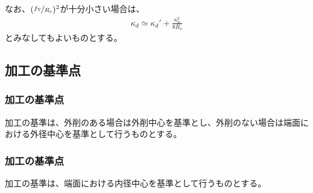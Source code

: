なお、$(\nicefrac{f_\mathrm T}{R_\mathrm c})^2$が十分小さい場合は、
\begin{align*}
  \kappa_d \simeq \kappa_d'+\frac{\kappa_w^2}{8R_\mathrm o}
\end{align*}
とみなしてもよいものとする。



\clearpage


\subsection{\EndFaceChamfer 加工の基準点}

\subsubsection{\EndFaceOutChamfer 加工の基準点}
\nameEndFaceOutChamfer 加工の基準は、外削のある場合は外削中心を基準とし、外削のない場合は端面における外径中心を基準として行うものとする。

\subsubsection{\EndFaceInChamfer 加工の基準点}
\nameEndFaceInChamfer 加工の基準は、端面における内径中心を基準として行うものとする。


